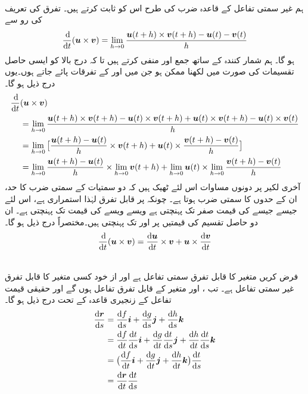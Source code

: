 \\
ہم غیر سمتی تفاعل کے قاعدہ ضرب کی طرح اس کو ثابت کرتے ہیں۔ تفرق کی تعریف کی رو سے
\begin{align*}
\frac{\dif}{\dif t}(\kvec{u}\times \kvec{v})=\lim_{h\to 0}\frac{\kvec{u}(t+h)\times \kvec{v}(t+h)-\kvec{u}(t)-\kvec{v}(t)}{h}
\end{align*}
ہو گا۔ ہم  شمار کنندہ  کے ساتھ    جمع اور منفی کرتے ہیں تا کہ درج بالا   کو ایسی حاصل تقسیمات  کی صورت میں لکھنا ممکن ہو جن میں   اور  کے تفرقات    پائے جاتے ہوں۔یوں درج ذیل ہو گا۔
\begin{align*}
\frac{\dif}{\dif t}&(\kvec{u}\times \kvec{v})\\
&=\lim_{h\to 0}\frac{\kvec{u}(t+h)\times \kvec{v}(t+h)-\kvec{u}(t)\times \kvec{v}(t+h)+\kvec{u}(t)\times \kvec{v}(t+h)-\kvec{u}(t)\times \kvec{v}(t)}{h}\\
&=\lim_{h\to 0}\big[\frac{\kvec{u}(t+h)-\kvec{u}(t)}{h}\times \kvec{v}(t+h)+\kvec{u}(t)\times \frac{\kvec{v}(t+h)-\kvec{v}(t)}{h}\big]\\
&=\lim_{h\to 0}\frac{\kvec{u}(t+h)-\kvec{u}(t)}{h}\times \lim_{h\to 0}\kvec{v}(t+h)+\lim_{h\to 0}\kvec{u}(t)\times \lim_{h\to 0}\frac{\kvec{v}(t+h)-\kvec{v}(t)}{h}
\end{align*}
آخری لکیر پر دونوں مساوات اس لئے ٹھیک ہیں کہ دو سمتیات کے سمتی ضرب کا حد،  ان کے حدوں کا سمتی ضرب ہوتا ہے۔  چونکہ  پر  قابل تفرق لہٰذا استمراری ہے، اس لئے   جیسے جیسے  کی قیمت صفر تک پہنچتی ہے ویسے ویسے   کی قیمت  تک پہنچتی ہے۔ ان  دو حاصل تقسیم کی قیمتیں   پر   اور  تک پہنچتی ہیں۔مختصراً درج ذیل ہو گا۔
\begin{align*}
\frac{\dif}{\dif t}(\kvec{u}\times\kvec{v})=\frac{\dif \kvec{u}}{\dif t}\times \kvec{v}+\kvec{u}\times\frac{\dif \kvec{v}}{\dif t}
\end{align*} 

\\
فرض کریں  متغیر  کا قابل تفرق سمتی  تفاعل ہے اور  از خود کسی متغیر  کا قابل تفرق غیر سمتی تفاعل ہے۔ تب ،  اور  متغیر  کے قابل تفرق تفاعل ہوں گے  اور حقیقی قیمت تفاعل کے زنجیری قاعدہ کے تحت درج ذیل ہو گا۔
\begin{align*}
\frac{\dif \kvec{r}}{\dif s}&=\frac{\dif f}{\dif s}\ai+\frac{\dif g}{\dif s}\aj+\frac{\dif h}{\dif s}\ak\\
&=\frac{\dif f}{\dif t}\frac{\dif t}{\dif s}\ai+\frac{\dif g}{\dif t}\frac{\dif t}{\dif s}\aj+\frac{\dif h}{\dif t}\frac{\dif t}{\dif s}\ak\\
&=\big(\frac{\dif f}{\dif t}\ai+\frac{\dif g}{\dif t}\aj+\frac{\dif h}{\dif t}\ak\big)\frac{\dif t}{\dif s}\\
&=\frac{\dif \kvec{r}}{\dif t}\frac{\dif t}{\dif s}
\end{align*}

